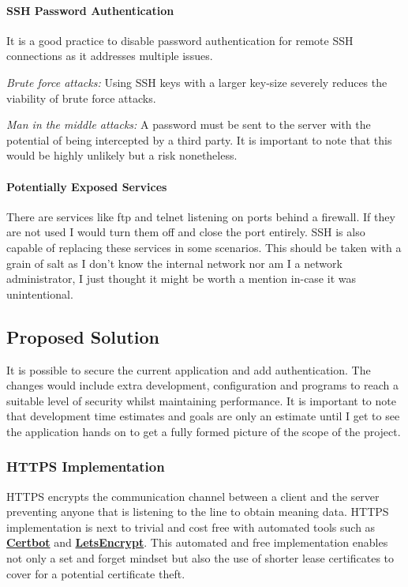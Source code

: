 \paragraph{SSH Password Authentication}
It is a good practice to disable password authentication for remote SSH connections as it addresses multiple issues.
\begin{description}
    \item \emph{Brute force attacks:} Using SSH keys with a larger key-size severely reduces the viability of brute force attacks.
    \item \emph{Man in the middle attacks:} A password must be sent to the server with the potential of being intercepted by a third party.
    It is important to note that this would be highly unlikely but a risk nonetheless.
\end{description}

\paragraph{Potentially Exposed Services}
There are services like ftp and telnet listening on ports behind a firewall.
If they are not used I would turn them off and close the port entirely.
SSH is also capable of replacing these services in some scenarios.
This should be taken with a grain of salt as I don't know the internal network nor
am I a network administrator, I just thought it might be worth a mention in-case it was unintentional.



\pagebreak
\subsection{Proposed Solution}\label{subsec:proposed-solution}
It is possible to secure the current application and add authentication.
The changes would include extra development, configuration and programs to reach a suitable level of security whilst maintaining performance.
It is important to note that development time estimates and goals are only an estimate until I get to see the application hands on to get a fully
formed picture of the scope of the project.

\subsubsection{HTTPS Implementation}
HTTPS encrypts the communication channel between a client and the server preventing anyone that is listening to the line to obtain meaning data.
HTTPS implementation is next to trivial and cost free with automated tools such as \href{https://certbot.eff.org/}{\textbf{Certbot}} and 
\href{https://letsencrypt.org/}{\textbf{LetsEncrypt}}.
This automated and free implementation enables not only a set and forget mindset but also the use of shorter lease certificates to cover for
a potential certificate theft.

